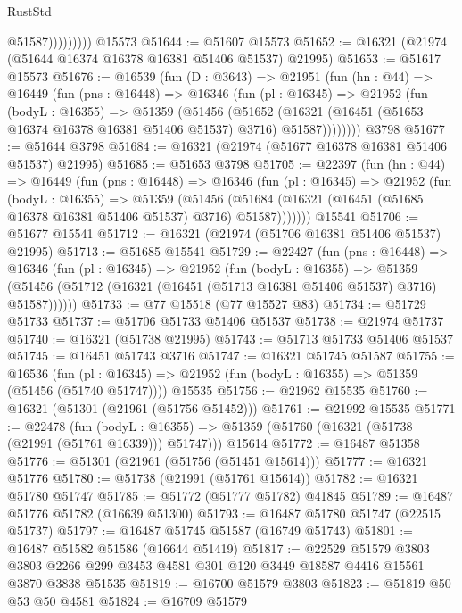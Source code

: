 \begin{lexlean}{RustStd}
\begin{coremodule}
                      @51587)))))))))
    @15573
@51644 := @51607 @15573
@51652 := @16321 (@21974 (@51644 @16374 @16378 @16381 @51406 @51537) @21995)
@51653 := @51617 @15573
@51676 := @16539
    (fun (D : @3643) =>
    @21951
      (fun (hn : @44) =>
      @16449
        (fun (pns : @16448) =>
        @16346
          (fun (pl : @16345) =>
          @21952
            (fun (bodyL : @16355) =>
            @51359
              (@51456
                (@51652
                  (@16321 (@16451 (@51653 @16374 @16378 @16381 @51406 @51537) @3716) @51587))))))))
    @3798
@51677 := @51644 @3798
@51684 := @16321 (@21974 (@51677 @16378 @16381 @51406 @51537) @21995)
@51685 := @51653 @3798
@51705 := @22397
    (fun (hn : @44) =>
    @16449
      (fun (pns : @16448) =>
      @16346
        (fun (pl : @16345) =>
        @21952
          (fun (bodyL : @16355) =>
          @51359
            (@51456
              (@51684 (@16321 (@16451 (@51685 @16378 @16381 @51406 @51537) @3716) @51587)))))))
    @15541
@51706 := @51677 @15541
@51712 := @16321 (@21974 (@51706 @16381 @51406 @51537) @21995)
@51713 := @51685 @15541
@51729 := @22427
    (fun (pns : @16448) =>
    @16346
      (fun (pl : @16345) =>
      @21952
        (fun (bodyL : @16355) =>
        @51359 (@51456 (@51712 (@16321 (@16451 (@51713 @16381 @51406 @51537) @3716) @51587))))))
@51733 := @77 @15518 (@77 @15527 @83)
@51734 := @51729 @51733
@51737 := @51706 @51733 @51406 @51537
@51738 := @21974 @51737
@51740 := @16321 (@51738 @21995)
@51743 := @51713 @51733 @51406 @51537
@51745 := @16451 @51743 @3716
@51747 := @16321 @51745 @51587
@51755 := @16536
    (fun (pl : @16345) => @21952 (fun (bodyL : @16355) => @51359 (@51456 (@51740 @51747))))
    @15535
@51756 := @21962 @15535
@51760 := @16321 (@51301 (@21961 (@51756 @51452)))
@51761 := @21992 @15535
@51771 := @22478
    (fun (bodyL : @16355) => @51359 (@51760 (@16321 (@51738 (@21991 (@51761 @16339))) @51747)))
    @15614
@51772 := @16487 @51358
@51776 := @51301 (@21961 (@51756 (@51451 @15614)))
@51777 := @16321 @51776
@51780 := @51738 (@21991 (@51761 @15614))
@51782 := @16321 @51780 @51747
@51785 := @51772 (@51777 @51782) @41845
@51789 := @16487 @51776 @51782 (@16639 @51300)
@51793 := @16487 @51780 @51747 (@22515 @51737)
@51797 := @16487 @51745 @51587 (@16749 @51743)
@51801 := @16487 @51582 @51586 (@16644 @51419)
@51817 := @22529
    @51579
    @3803
    @3803
    @2266
    @299
    @3453
    @4581
    @301
    @120
    @3449
    @18587
    @4416
    @15561
    @3870
    @3838
    @51535
@51819 := @16700 @51579 @3803
@51823 := @51819 @50 @53 @50 @4581
@51824 := @16709 @51579

\end{coremodule}
\end{lexlean}

